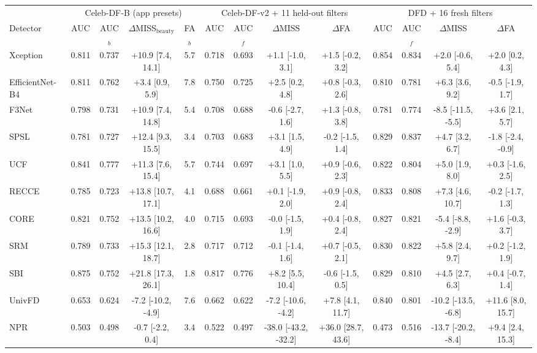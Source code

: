 \begin{tabular}{@{}l cccc cccc cccc@{}}
\toprule
 & \multicolumn{4}{c}{Celeb-DF-B (app presets)} & \multicolumn{4}{c}{Celeb-DF-v2 + 11 held-out filters} & \multicolumn{4}{c}{DFD + 16 fresh filters} \\
\cmidrule(lr){2-5}\cmidrule(lr){6-9}\cmidrule(lr){10-13}
Detector & AUC & AUC$_b$ & $\Delta$MISS$_\text{beauty}$ & FA$_b$ & AUC & AUC$_f$ & $\Delta$MISS & $\Delta$FA & AUC & AUC$_f$ & $\Delta$MISS & $\Delta$FA \\
\midrule
Xception & 0.811 & 0.737 & +10.9 [7.4, 14.1] & 5.7 & 0.718 & 0.693 & +1.1 [-1.0, 3.1] & +1.5 [-0.2, 3.2] & 0.854 & 0.834 & +2.0 [-0.6, 5.4] & +2.0 [0.2, 4.3] \\
EfficientNet-B4 & 0.811 & 0.762 & +3.4 [0.9, 5.9] & 7.8 & 0.750 & 0.725 & +2.5 [0.2, 4.8] & +0.8 [-0.3, 2.6] & 0.810 & 0.781 & +6.3 [3.6, 9.2] & -0.5 [-1.9, 1.7] \\
F3Net & 0.798 & 0.731 & +10.9 [7.4, 14.8] & 5.4 & 0.708 & 0.688 & -0.6 [-2.7, 1.6] & +1.3 [-0.8, 3.8] & 0.781 & 0.774 & -8.5 [-11.5, -5.5] & +3.6 [2.1, 5.7] \\
SPSL & 0.781 & 0.727 & +12.4 [9.3, 15.5] & 3.4 & 0.703 & 0.683 & +3.1 [1.5, 4.9] & -0.2 [-1.5, 1.4] & 0.829 & 0.837 & +4.7 [3.2, 6.7] & -1.8 [-2.4, -0.9] \\
UCF & 0.841 & 0.777 & +11.3 [7.6, 15.4] & 5.7 & 0.744 & 0.697 & +3.1 [1.0, 5.5] & +0.9 [-0.6, 2.3] & 0.822 & 0.804 & +5.0 [1.9, 8.0] & +0.3 [-1.6, 2.5] \\
RECCE & 0.785 & 0.723 & +13.8 [10.7, 17.1] & 4.1 & 0.688 & 0.661 & +0.1 [-1.9, 2.0] & +0.9 [-0.8, 2.4] & 0.833 & 0.808 & +7.3 [4.6, 10.7] & -0.2 [-1.7, 1.3] \\
CORE & 0.821 & 0.752 & +13.5 [10.2, 16.6] & 4.0 & 0.715 & 0.693 & -0.0 [-1.5, 1.9] & +0.4 [-0.8, 2.4] & 0.827 & 0.821 & -5.4 [-8.8, -2.9] & +1.6 [-0.3, 3.7] \\
SRM & 0.789 & 0.733 & +15.3 [12.1, 18.7] & 2.8 & 0.717 & 0.712 & -0.1 [-1.4, 1.6] & +0.7 [-0.5, 2.1] & 0.830 & 0.822 & +5.8 [2.4, 9.7] & +0.2 [-1.2, 1.9] \\
SBI~\cite{sbi} & 0.875 & 0.752 & +21.8 [17.3, 26.1] & 1.8 & 0.817 & 0.776 & +8.2 [5.5, 10.4] & -0.6 [-1.5, 0.5] & 0.829 & 0.810 & +4.5 [2.7, 6.3] & +0.4 [-0.7, 1.4] \\
UnivFD & 0.653 & 0.624 & -7.2 [-10.2, -4.9] & 7.6 & 0.662 & 0.622 & -7.2 [-10.6, -4.2] & +7.8 [4.1, 11.7] & 0.840 & 0.801 & -10.2 [-13.5, -6.8] & +11.6 [8.0, 15.7] \\
NPR & 0.503 & 0.498 & -0.7 [-2.2, 0.4] & 3.4 & 0.522 & 0.497 & -38.0 [-43.2, -32.2] & +36.0 [28.7, 43.6] & 0.473 & 0.516 & -13.7 [-20.2, -8.4] & +9.4 [2.4, 15.3] \\

\end{tabular}

